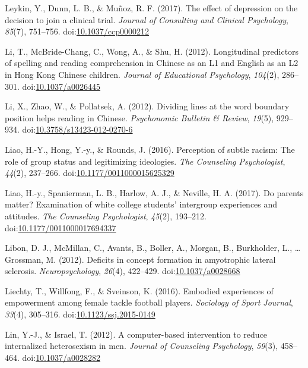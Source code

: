 \documentclass[english,man]{apa6}
\begin{document}
\hypertarget{ref-Leykin2017a}{}
Leykin, Y., Dunn, L. B., \& Muñoz, R. F. (2017). The effect of
depression on the decision to join a clinical trial. \emph{Journal of
Consulting and Clinical Psychology}, \emph{85}(7), 751--756.
doi:\href{https://doi.org/10.1037/ccp0000212}{10.1037/ccp0000212}

\hypertarget{ref-Li2012a}{}
Li, T., McBride-Chang, C., Wong, A., \& Shu, H. (2012). Longitudinal
predictors of spelling and reading comprehension in Chinese as an L1 and
English as an L2 in Hong Kong Chinese children. \emph{Journal of
Educational Psychology}, \emph{104}(2), 286--301.
doi:\href{https://doi.org/10.1037/a0026445}{10.1037/a0026445}

\hypertarget{ref-Li2012}{}
Li, X., Zhao, W., \& Pollatsek, A. (2012). Dividing lines at the word
boundary position helps reading in Chinese. \emph{Psychonomic Bulletin
\& Review}, \emph{19}(5), 929--934.
doi:\href{https://doi.org/10.3758/s13423-012-0270-6}{10.3758/s13423-012-0270-6}

\hypertarget{ref-Liao2016}{}
Liao, H.-Y., Hong, Y.-y., \& Rounds, J. (2016). Perception of subtle
racism: The role of group status and legitimizing ideologies. \emph{The
Counseling Psychologist}, \emph{44}(2), 237--266.
doi:\href{https://doi.org/10.1177/0011000015625329}{10.1177/0011000015625329}

\hypertarget{ref-Liao2017}{}
Liao, H.-y., Spanierman, L. B., Harlow, A. J., \& Neville, H. A. (2017).
Do parents matter? Examination of white college students' intergroup
experiences and attitudes. \emph{The Counseling Psychologist},
\emph{45}(2), 193--212.
doi:\href{https://doi.org/10.1177/0011000017694337}{10.1177/0011000017694337}

\hypertarget{ref-Libon2012}{}
Libon, D. J., McMillan, C., Avants, B., Boller, A., Morgan, B.,
Burkholder, L., \ldots{} Grossman, M. (2012). Deficits in concept
formation in amyotrophic lateral sclerosis. \emph{Neuropsychology},
\emph{26}(4), 422--429.
doi:\href{https://doi.org/10.1037/a0028668}{10.1037/a0028668}

\hypertarget{ref-Liechty2016}{}
Liechty, T., Willfong, F., \& Sveinson, K. (2016). Embodied experiences
of empowerment among female tackle football players. \emph{Sociology of
Sport Journal}, \emph{33}(4), 305--316.
doi:\href{https://doi.org/10.1123/ssj.2015-0149}{10.1123/ssj.2015-0149}

\hypertarget{ref-Lin2012}{}
Lin, Y.-J., \& Israel, T. (2012). A computer-based intervention to
reduce internalized heterosexism in men. \emph{Journal of Counseling
Psychology}, \emph{59}(3), 458--464.
doi:\href{https://doi.org/10.1037/a0028282}{10.1037/a0028282}
\end{document}

